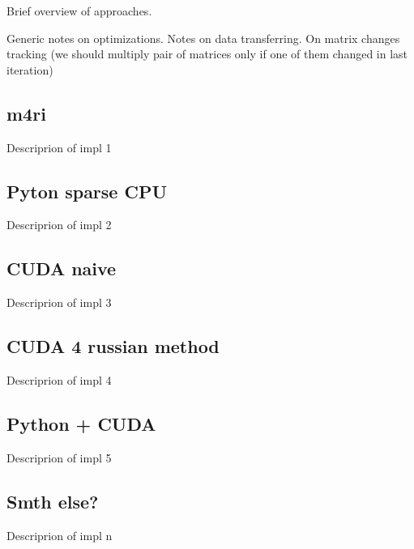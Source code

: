 Brief overview of approaches.

Generic notes on optimizations.
Notes on data transferring.
On matrix changes tracking (we should multiply pair of matrices only if one of them changed in last iteration)

\subsection{m4ri}

Descriprion of impl 1~\cite{M4RI}

\subsection{Pyton sparse CPU}

Descriprion of impl 2

\subsection{CUDA naive}

Descriprion of impl 3

\subsection{CUDA 4 russian method}

Descriprion of impl 4

\subsection{Python + CUDA}

Descriprion of impl 5

\subsection{Smth else?}

Descriprion of impl n
